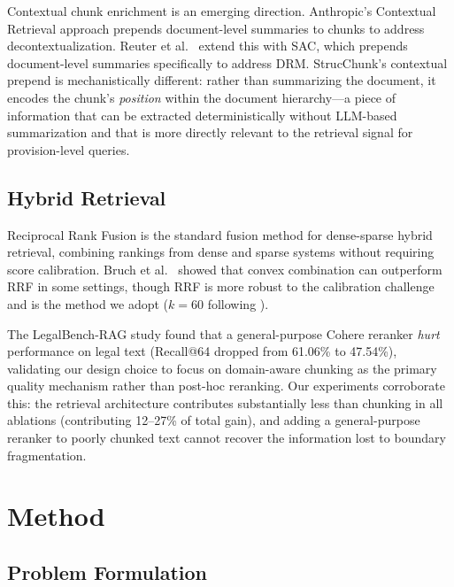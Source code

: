 \documentclass[sn-mathphys,Numbered]{sn-jnl}%
\begin{document}
Contextual chunk enrichment is an emerging direction.  Anthropic's
Contextual Retrieval approach prepends document-level summaries to chunks
to address decontextualization.  Reuter et al.~\cite{reuter-etal-2025-towards} extend this
with SAC, which prepends document-level summaries specifically to address
DRM.  StrucChunk's contextual prepend is mechanistically different: rather
than summarizing the document, it encodes the chunk's \emph{position}
within the document hierarchy---a piece of information that can be
extracted deterministically without LLM-based summarization and that is
more directly relevant to the retrieval signal for provision-level queries.

\subsection{Hybrid Retrieval}
\label{sec:related_hybrid}

Reciprocal Rank Fusion \cite{Cormack2009ReciprocalRF} is the standard
fusion method for dense-sparse hybrid retrieval, combining rankings from
dense and sparse systems without requiring score calibration.
Bruch et al.~\cite{Bruch_2023} showed that convex combination can outperform
RRF in some settings, though RRF is more robust to the calibration
challenge and is the method we adopt ($k=60$ following
\cite{Cormack2009ReciprocalRF}).

The LegalBench-RAG study \cite{pipitone2024legalbenchragbenchmarkretrievalaugmentedgeneration} found that a
general-purpose Cohere reranker \emph{hurt} performance on legal text
(Recall@64 dropped from 61.06\% to 47.54\%), validating our design
choice to focus on domain-aware chunking as the primary quality mechanism
rather than post-hoc reranking.  Our experiments corroborate this: the
retrieval architecture contributes substantially less than chunking in
all ablations (contributing 12--27\% of total gain), and adding a
general-purpose reranker to poorly chunked text cannot recover the
information lost to boundary fragmentation.

\section{Method}
\label{sec:method}

\subsection{Problem Formulation}
\label{sec:problem}
\end{document}

